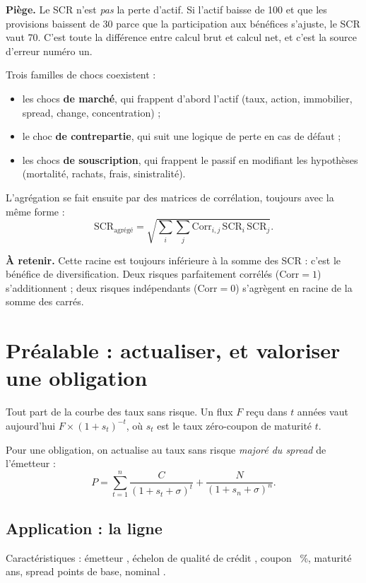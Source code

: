 \documentclass[11pt,a4paper]{article}
\newcommand{\piege}[1]{\par\smallskip\noindent\textcolor{rouge}{\textbf{Piège.}} #1\par\smallskip}
\newcommand{\astuce}[1]{\par\smallskip\noindent\textcolor{vertfonce}{\textbf{À retenir.}} #1\par\smallskip}
\newcommand{\Meuro}{\text{M\texteuro}}
\begin{document}
\piege{Le SCR n'est \emph{pas} la perte d'actif. Si l'actif baisse de 100 et que les provisions
baissent de 30 parce que la participation aux bénéfices s'ajuste, le SCR vaut 70. C'est toute la
différence entre calcul brut et calcul net, et c'est la source d'erreur numéro un.}

Trois familles de chocs coexistent :
\begin{itemize}
\item les chocs \textbf{de marché}, qui frappent d'abord l'actif (taux, action, immobilier,
      spread, change, concentration) ;
\item le choc \textbf{de contrepartie}, qui suit une logique de perte en cas de défaut ;
\item les chocs \textbf{de souscription}, qui frappent le passif en modifiant les hypothèses
      (mortalité, rachats, frais, sinistralité).
\end{itemize}

L'agrégation se fait ensuite par des matrices de corrélation, toujours avec la même forme :
\[
\mathrm{SCR}_{\text{agrégé}} = \sqrt{\sum_{i}\sum_{j} \mathrm{Corr}_{i,j}\,
\mathrm{SCR}_i\,\mathrm{SCR}_j}.
\]

\astuce{Cette racine est toujours inférieure à la somme des SCR : c'est le bénéfice de
diversification. Deux risques parfaitement corrélés ($\mathrm{Corr}=1$) s'additionnent ; deux
risques indépendants ($\mathrm{Corr}=0$) s'agrègent en racine de la somme des carrés.}

\section{Préalable : actualiser, et valoriser une obligation}

Tout part de la courbe des taux sans risque. Un flux $F$ reçu dans $t$ années vaut aujourd'hui
$F \times (1+s_t)^{-t}$, où $s_t$ est le taux zéro-coupon de maturité $t$.

Pour une obligation, on actualise au taux sans risque \emph{majoré du spread} de l'émetteur :
\[
P = \sum_{t=1}^{n} \frac{C}{(1+s_t+\sigma)^t} + \frac{N}{(1+s_n+\sigma)^n}.
\]

\subsection{Application : la ligne \OblId{}}

Caractéristiques : émetteur \OblEmetteur{}, échelon de qualité de crédit \OblCqs{}, coupon
\OblCoupon{}~\%, maturité \OblMaturite{} ans, spread \OblSpread{} points de base, nominal
\OblNominal{} \Meuro{}.
\end{document}
